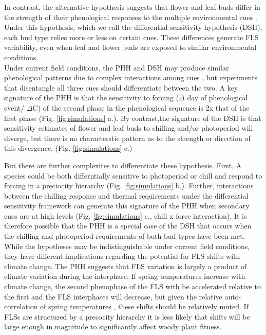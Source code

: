 \documentclass[11pt]{article}\usepackage[]{graphicx}\usepackage[]{color}
\begin{document}
\noindent In contrast, the alternative hypothesis suggests that flower and leaf buds differ in the strength of their phenological responses to the multiple environmental cues \citep{Citadin2001,Gariglio2006,Aslani2009,Mehlenbacher:1991aa}. Under this hypothesis, which we call the differential sensitivity hypothesis (DSH), each bud type relies more or less on certain cues. These differences generate FLS variability, even when leaf and flower buds are exposed to similar environmental conditions.\\ %

\noindent Under current field conditions, the PHH and DSH may produce similar phenological patterns due to complex interactions among cues \citep{}, but experiments that disentangle all three cues should differentiate between the two. A key signature of the PHH is that the sensitivity to forcing ($\Delta$ day of phenological event/ $\Delta$\degree C) of the second phase in the phenological sequence is 2x that of the first phase (Fig. \ref{fig:simulations} a.). By contrast,the signature of the DSH is that sensitivity estimates of flower and leaf buds to chilling and/or photoperiod will diverge, but there is no characterstic pattern as to the strength or direction of this divergence. (Fig. \ref{fig:simulations} c.)

But there are further complexites to differentiate these hypothesis. First, A species could be both differntially sensitive to photoperiod or chill and respond to forcing in a preciocity hierarchy (Fig. \ref{fig:simulations} b.). Further, interactions between the chilling response and thermal requirements under the differential sensitivity framework can generate this signature of the PHH when secondary cues are at high levels (Fig. \ref{fig:simulations} c., chill x force interaction). It is therefore possible that the PHH is a special case of the DSH that occurs when the chilling and photoperiod requirements of both bud types have been met.\\

\noident While the hypotheses may be indistinguishable under current field conditions, they have different implications regarding the potential for FLS shifts with climate change. The PHH suggests that FLS variation is largely a product of climate variation during the interphase. If spring temperatures increase with climate change, the second phenophase of the FLS with be accelerated relative to the first and the FLS interphases will decrease, but given the relative auto-correlation of spring temperatures \citep{Di-Cecco:2018aa}, these shifts should be relatively muted. If FLSs are structured by a precocity hierarchy it is less likely that shifts will be large enough in magnitude to significantly affect woody plant fitness.\\
\end{document}
